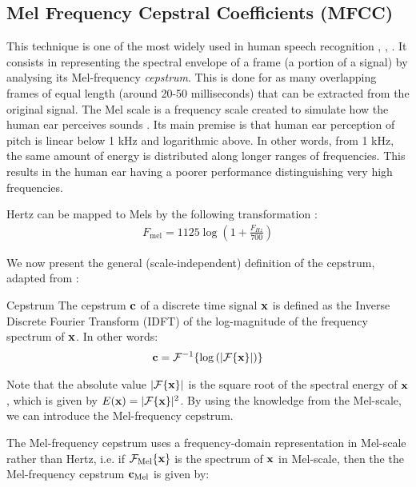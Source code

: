 \documentclass[../main.tex]{subfiles} \label{chapter_soa}
\begin{document}
\subsection{Mel Frequency Cepstral Coefficients (MFCC)} \label{subsection_mfcc}
\par This technique is one of the most widely used in human speech recognition \cite{Jurafsky2009}, \cite{Chou2008a}, \cite{Stowell2014}. It consists in representing the spectral envelope of a frame (a portion of a signal) by analysing its Mel-frequency \emph{cepstrum}. This is done for as many overlapping frames of equal length (around 20-50 milliseconds) that can be extracted from the original signal. The Mel scale is a frequency scale created to simulate how the human ear perceives sounds \cite{Sludge2000}. Its main premise is that human ear perception of pitch is linear below 1 kHz and logarithmic above. In other words, from 1 kHz, the same amount of energy is distributed along longer ranges of frequencies. This results in the human ear having a poorer performance distinguishing very high frequencies.
\par Hertz can be mapped to Mels by the following transformation \cite{Lyons2014}:
\begin{align*}
F_{\text{mel}} = 1125 \log{(1 + \frac{F_{Hz}}{700})}
\end{align*}
\par We now present the general (scale-independent) definition of the cepstrum, adapted from \cite{Gutierrez-Osuna2009}:
\begin{definition}{Cepstrum} \label{def_cepstrum}
The cepstrum $\mathbf{c}$ of a discrete time signal $\mathbf{x}$ is defined as the Inverse Discrete Fourier Transform (IDFT) of the log-magnitude of the frequency spectrum of $\mathbf{x}$. In other words:
\begin{align*}
\mathbf{c} = \mathcal{F}^{-1}\{\log{(\lvert\mathcal{F}\{\mathbf{x}\}\rvert)}\}
\end{align*}
\end{definition}
\par Note that the absolute value $\lvert\mathcal{F}\{\mathbf{x}\}\rvert$ is the square root of the spectral energy of $\mathbf{x}$, which is given by $E(\mathbf{x}) = \lvert\mathcal{F}\{\mathbf{x}\}\rvert^2$. By using the knowledge from the Mel-scale, we can introduce the Mel-frequency cepstrum. 
\par The Mel-frequency cepstrum uses a frequency-domain representation in Mel-scale rather than Hertz, i.e. if $\mathcal{F_{\text{Mel}}\{\mathbf{x}\}}$ is the spectrum of $\mathbf{x}$ in Mel-scale, then the the Mel-frequency cepstrum $\mathbf{c}_{\text{Mel}}$ is given by:
\end{document}
